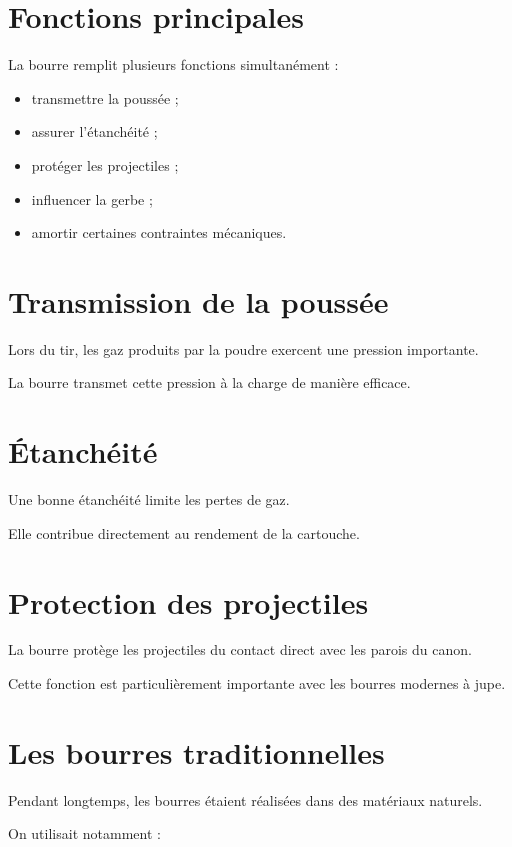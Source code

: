 \section{Fonctions principales}

La bourre remplit plusieurs fonctions simultanément :

\begin{itemize}
    \item transmettre la poussée ;
    \item assurer l'étanchéité ;
    \item protéger les projectiles ;
    \item influencer la gerbe ;
    \item amortir certaines contraintes mécaniques.
\end{itemize}

\section{Transmission de la poussée}

Lors du tir, les gaz produits par la poudre exercent une pression importante.

La bourre transmet cette pression à la charge de manière efficace.

\section{Étanchéité}

Une bonne étanchéité limite les pertes de gaz.

Elle contribue directement au rendement de la cartouche.

\section{Protection des projectiles}

La bourre protège les projectiles du contact direct avec les parois du canon.

Cette fonction est particulièrement importante avec les bourres modernes à
jupe.

\section{Les bourres traditionnelles}

Pendant longtemps, les bourres étaient réalisées dans des matériaux naturels.

On utilisait notamment :

